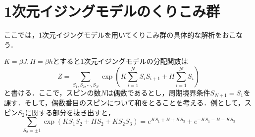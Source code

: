 \documentclass[a4paper,11pt]{jsarticle}
\begin{document}
\section{1次元イジングモデルのくりこみ群}
ここでは，1次元イジングモデルを用いてくりこみ群の具体的な解析をおこなう．\par
$K=\beta J,H=\beta h$とすると1次元イジングモデルの分配関数は
\begin{equation*}
  Z = \sum_{S_1, S_2, \cdots , S_N} \exp \left( K\sum_{i=1}^{N}S_i S_{i+1} + H \sum_{i=1}^{N}S_i \right)
\end{equation*}
と書ける．ここで，スピンの数$N$は偶数であるとし，周期境界条件$S_{N+1}=S_1$を課す．そして，偶数番目のスピンについて和をとることを考える．例として，スピン$S_2$に関する部分を抜き出すと，
\begin{equation*}
  \sum_{S_2=\pm 1} \exp (K S_1 S_2 + H S_2 + K S_2 S_3) = e^{K S_1 + H + K S_3} + e^{-K S_1 - H - K S_3}
\end{equation*}
\end{document}

